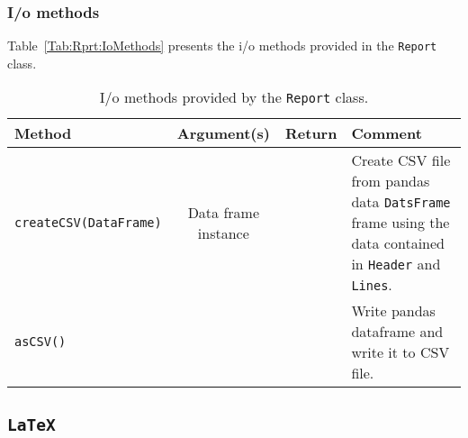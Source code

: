 \subsubsection{I/o methods}
\noindent
Table~\ref{Tab:Rprt:IoMethods} presents the i/o methods provided in
the \texttt{Report} class.
\begin{table}[h]
  \caption{
    I/o methods provided by the \texttt{Report} class. 
  }
  \label{Tab:Rprt:ProcMethods}
  \begin{center}
    \begin{tabular}{|l|c|c|p{7cm}|}
      \hline
      \textbf{Method} & \textbf{Argument(s)} & \textbf{Return} & \textbf{Comment}                                                       \\
      \hline
      \texttt{createCSV(DataFrame)} & Data frame instance & & Create CSV file from pandas data \texttt{DatsFrame} frame using the data
                                                              contained in \texttt{Header} and \texttt{Lines}.                          \\
      \texttt{asCSV()}              &                     & & Write pandas dataframe and write it to CSV file.                          \\
      \hline
    \end{tabular}
  \end{center}
\end{table}

\subsection{\texttt{LaTeX}}
\label{SubSect:LTX}

